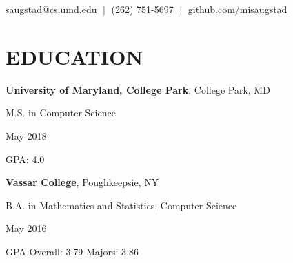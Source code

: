 \documentclass{res}
\newcommand{\vb}{\; | \;}
\begin{document}
 
                                  
\begin{resume}
\vspace{-5pt}
{\large %
  \begin{center}
    \href{mailto:saugstad@cs.umd.edu}{saugstad@cs.umd.edu} $\vb$
    (262) 751-5697 $\vb$
    \href{https://github.com/misaugstad}
         {github.com/misaugstad}
  \end{center}

  \vspace{-2pt}
  \section{\hspace{0.2in}EDUCATION}
    \vspace{3pt} %
    {\bf University of Maryland, College Park}, College Park, MD\\
    \begin{minipage}{5.6in}
      M.S. in Computer Science
    \end{minipage}
    \begin{minipage}{2in}
      May 2018
    \end{minipage}
    GPA: 4.0

    \vspace{-5pt} %
    {\bf Vassar College}, Poughkeepsie, NY\\
    \begin{minipage}{5.6in}
      B.A. in Mathematics and Statistics, Computer Science
    \end{minipage}
    \begin{minipage}{2in}
      May 2016
    \end{minipage}
    GPA Overall: 3.79  Majors: 3.86

  \vspace{-1pt}
}
\end{resume}
\end{document}

